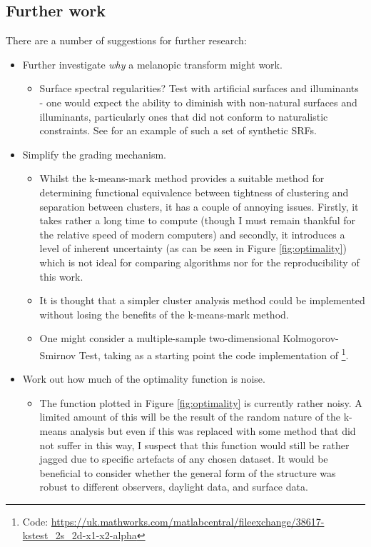 \subsection{Further work}

There are a number of suggestions for further research:
\begin{itemize}
\item Further investigate \emph{why} a melanopic transform might work.
\begin{itemize}
\item Surface spectral regularities? Test with artificial surfaces and illuminants - one would expect the ability to diminish with non-natural surfaces and illuminants, particularly ones that did not conform to naturalistic constraints. See \citet[p. 239-40]{macdonald_realistic_2014} for an example of such a set of synthetic \glspl{SRF}.
\end{itemize}
\item Simplify the grading mechanism.
\begin{itemize}
    \item Whilst the k-means-mark method provides a suitable method for determining functional equivalence between tightness of clustering and separation between clusters, it has a couple of annoying issues. Firstly, it takes rather a long time to compute (though I must remain thankful for the relative speed of modern computers) and secondly, it introduces a level of inherent uncertainty (as can be seen in Figure \ref{fig:optimality}) which is not ideal for comparing algorithms nor for the reproducibility of this work.
    \item It is thought that a simpler cluster analysis method could be implemented without losing the benefits of the k-means-mark method.
    \item One might consider a multiple-sample two-dimensional Kolmogorov-Smirnov Test, taking as a starting point the code implementation of \citet{peacock_two-dimensional_1983}\footnote{Code: \url{https://uk.mathworks.com/matlabcentral/fileexchange/38617-kstest_2s_2d-x1-x2-alpha}}.
\end{itemize}
\item Work out how much of the optimality function is noise.
\begin{itemize}
\item The function plotted in Figure \ref{fig:optimality} is currently rather noisy. A limited amount of this will be the result of the random nature of the k-means analysis but even if this was replaced with some method that did not suffer in this way, I suspect that this function would still be rather jagged due to specific artefacts of any chosen dataset. It would be beneficial to consider whether the general form of the structure was robust to different observers, daylight data, and surface data.

\end{itemize}
\end{itemize}
